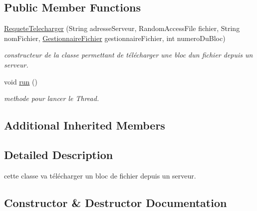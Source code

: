 \subsection*{Public Member Functions}
\begin{DoxyCompactItemize}
\item 
\hyperlink{classrequete_1_1RequeteTelecharger_a5c4fa1ef19064d12dc2ed51ecc5f3ba3}{Requete\+Telecharger} (String adresse\+Serveur, Random\+Access\+File fichier, String nom\+Fichier, \hyperlink{classterminalClient_1_1GestionnaireFichier}{Gestionnaire\+Fichier} gestionnaire\+Fichier, int numero\+Du\+Bloc)
\begin{DoxyCompactList}\small\item\em constructeur de la classe permettant de télécharger une bloc d\textquotesingle{}un fichier depuis un serveur. \end{DoxyCompactList}\item 
\mbox{\label{classrequete_1_1RequeteTelecharger_a89314ecc5cdf732dd3f1d670dc13551f}} 
void \hyperlink{classrequete_1_1RequeteTelecharger_a89314ecc5cdf732dd3f1d670dc13551f}{run} ()
\begin{DoxyCompactList}\small\item\em methode pour lancer le Thread. \end{DoxyCompactList}\end{DoxyCompactItemize}
\subsection*{Additional Inherited Members}


\subsection{Detailed Description}
cette classe va télécharger un bloc de fichier depuis un serveur. 

\subsection{Constructor \& Destructor Documentation}
\mbox{\label{classrequete_1_1RequeteTelecharger_a5c4fa1ef19064d12dc2ed51ecc5f3ba3}} 
